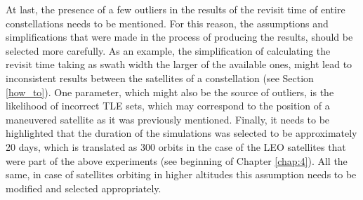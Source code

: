 
\bigskip
At last, the presence of a few outliers in the results of the revisit time of entire constellations needs to be mentioned. For this reason, the assumptions and simplifications that were made in the process of producing the results, should be selected more carefully. As an example, the simplification of calculating the revisit time taking as swath width the larger of the available ones, might lead to inconsistent results between the satellites of a constellation (see Section \ref{how_to}). One parameter, which might also be the source of outliers, is the likelihood of incorrect TLE sets, which may correspond to the position of a maneuvered satellite as it was previously mentioned. Finally, it needs to be highlighted that the duration of the simulations was selected to be approximately 20 days, which is translated as 300 orbits in the case of the LEO satellites that were part of the above experiments (see beginning of Chapter \ref{chap:4}). All the same, in case of satellites orbiting in higher altitudes this assumption needs to be modified and selected appropriately.

